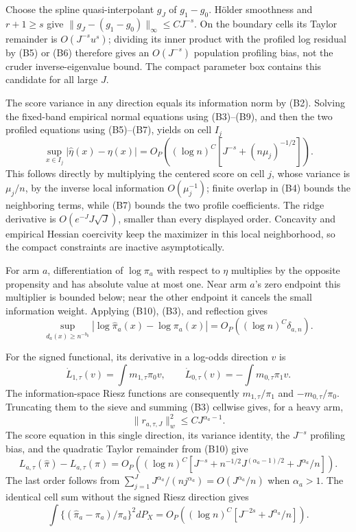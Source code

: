 Choose the spline quasi-interpolant \(g_J\) of \(g_1-g_0\).  Hölder smoothness and \(r+1\ge s\) give \(\|g_J-(g_1-g_0)\|_\infty\le CJ^{-s}\).  On the boundary cells its Taylor remainder is \(O(J^{-s}u^s)\); dividing its inner product with the profiled log residual by (B5) or (B6) therefore gives an \(O(J^{-s})\) population profiling bias, not the cruder inverse-eigenvalue bound.  The compact parameter box contains this candidate for all large \(J\).

The score variance in any direction equals its information norm by (B2).  Solving the fixed-band empirical normal equations using (B3)--(B9), and then the two profiled equations using (B5)--(B7), yields on cell \(I_j\)
\[
 \sup_{x\in I_j}|\widehat\eta(x)-\eta(x)|
 =O_P\!\left((\log n)^C\left[J^{-s}+(n\mu_j)^{-1/2}\right]\right).
\tag{B10}
\]
This follows directly by multiplying the centered score on cell \(j\), whose variance is \(\mu_j/n\), by the inverse local information \(O(\mu_j^{-1})\); finite overlap in (B4) bounds the neighboring terms, while (B7) bounds the two profile coefficients.  The ridge derivative is \(O(e^{-J}J\sqrt J)\), smaller than every displayed order.  Concavity and empirical Hessian coercivity keep the maximizer in this local neighborhood, so the compact constraints are inactive asymptotically.

For arm \(a\), differentiation of \(\log\pi_a\) with respect to \(\eta\) multiplies by the opposite propensity and has absolute value at most one.  Near arm \(a\)'s zero endpoint this multiplier is bounded below; near the other endpoint it cancels the small information weight.  Applying (B10), (B3), and reflection gives
\[
 \sup_{d_a(x)\ge n^{-b_0}}|\log\widehat\pi_a(x)-\log\pi_a(x)|
 =O_P\!\left((\log n)^C\delta_{a,n}\right).
\tag{B11}
\]

For the signed functional, its derivative in a log-odds direction \(v\) is
\[
 \dot L_{1,\tau}(v)=\int m_{1,\tau}\pi_0v,
 \qquad
 \dot L_{0,\tau}(v)=-\int m_{0,\tau}\pi_1v.
\tag{B12}
\]
The information-space Riesz functions are consequently \(m_{1,\tau}/\pi_1\) and \(-m_{0,\tau}/\pi_0\).  Truncating them to the sieve and summing (B3) cellwise gives, for a heavy arm,
\[
 \|r_{a,\tau,J}\|_w^2\le CJ^{\alpha_a-1}.
\tag{B13}
\]
The score equation in this single direction, its variance identity, the \(J^{-s}\) profiling bias, and the quadratic Taylor remainder from (B10) give
\[
 L_{a,\tau}(\widehat\pi)-L_{a,\tau}(\pi)
 =O_P\!\left((\log n)^C\left[J^{-s}+n^{-1/2}J^{(\alpha_a-1)/2}+J^{\alpha_a}/n\right]\right).
\tag{B14}
\]
The last order follows from
\(\sum_{j=1}^J J^{\alpha_a}/(nj^{\alpha_a})=O(J^{\alpha_a}/n)\) when \(\alpha_a>1\).  The identical cell sum without the signed Riesz direction gives
\[
 \int\{(\widehat\pi_a-\pi_a)/\pi_a\}^2dP_X
 =O_P\!\left((\log n)^C[J^{-2s}+J^{\alpha_a}/n]\right).
\tag{B15}
\]

